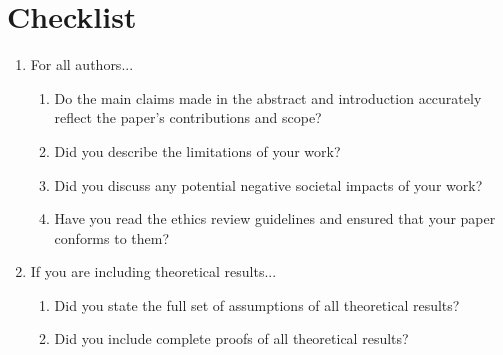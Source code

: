 \documentclass[]{article}
\begin{document}


{
\small

}

\section*{Checklist}

\begin{enumerate}

\item For all authors...
\begin{enumerate}
  \item Do the main claims made in the abstract and introduction accurately reflect the paper's contributions and scope?
    \answerYes{}
  \item Did you describe the limitations of your work?
  \item Did you discuss any potential negative societal impacts of your work?
  \item Have you read the ethics review guidelines and ensured that your paper conforms to them?
    \answerYes{}
\end{enumerate}

\item If you are including theoretical results...
\begin{enumerate}
  \item Did you state the full set of assumptions of all theoretical results?
	\item Did you include complete proofs of all theoretical results?
    \answerNA{}
\end{enumerate}


\end{enumerate}
\end{document}
